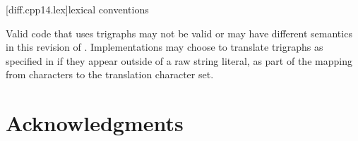 \documentclass{wg21}
\begin{document}
%
%
%
%

[diff.cpp14.lex]{lexical conventions}

Valid \CppXIV{} code that uses trigraphs may not be valid or may have different
semantics in this revision of \Cpp{}. Implementations may choose to
translate trigraphs as specified in \CppXIV{} if they appear outside of a raw
string literal, as part of the mapping from  characters to
the translation character set.


\section{Acknowledgments}
\end{document}
